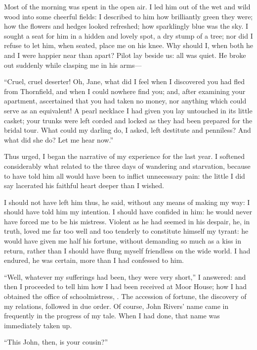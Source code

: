 Most of the morning was spent in the open air. I led him out of the wet
and wild wood into some cheerful fields: I described to him how
brilliantly green they were; how the flowers and hedges looked
refreshed; how sparklingly blue was the sky. I sought a seat for him in
a hidden and lovely spot, a dry stump of a tree; nor did I refuse to let
him, when seated, place me on his knee. Why should I, when both he and
I were happier near than apart? Pilot lay beside us: all was quiet. He
broke out suddenly while clasping me in his arms---

\enquote{Cruel, cruel deserter! Oh, Jane, what did I feel when I
	discovered you had fled from Thornfield, and when I could nowhere find
	you; and, after examining your apartment, ascertained that you had taken
	no money, nor anything which could serve as an equivalent! A pearl
	necklace I had given you lay untouched in its little casket; your trunks
	were left corded and locked as they had been prepared for the bridal
	tour. What could my darling do, I asked, left destitute and penniless?
	And what did she do? Let me hear now.}

Thus urged, I began the narrative of my experience for the last year. I
softened considerably what related to the three days of wandering and
starvation, because to have told him all would have been to inflict
unnecessary pain: the little I did say lacerated his faithful heart
deeper than I wished.

I should not have left him thus, he said, without any means of making my
way: I should have told him my intention. I should have confided in
him: he would never have forced me to be his mistress. Violent as he
had seemed in his despair, he, in truth, loved me far too well and too
tenderly to constitute himself my tyrant: he would have given me half
his fortune, without demanding so much as a kiss in return, rather than
I should have flung myself friendless on the wide world. I had endured,
he was certain, more than I had confessed to him.

\enquote{Well, whatever my sufferings had been, they were very short,} I
answered: and then I proceeded to tell him how I had been received at
Moor House; how I had obtained the office of schoolmistress, \etc. The
accession of fortune, the discovery of my relations, followed in due
order. Of course, \St{} John Rivers' name came in frequently in the
progress of my tale. When I had done, that name was immediately taken
up.

\enquote{This \St{} John, then, is your cousin?}

